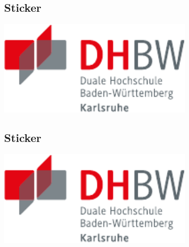 \subsection{Sticker}
\begin{frame}{\subsecname}

  \begin{sticker}[0]
    \includegraphics[width=0.7\textwidth]{DHBW.pdf}
  \end{sticker}

\end{frame}

\subsection{Sticker}
\begin{frame}{\subsecname}

  \begin{sticker}[-1]
    \includegraphics[width=0.7\textwidth]{DHBW.pdf}
  \end{sticker}

\end{frame}












